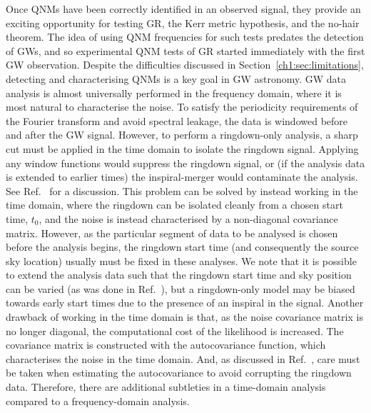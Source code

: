 Once QNMs have been correctly identified in an observed signal, they provide an exciting opportunity for testing GR, the Kerr metric hypothesis, and the no-hair theorem. 
The idea of using QNM frequencies for such tests predates the detection of GWs, and so experimental QNM tests of GR started immediately with the first GW observation.
Despite the difficulties discussed in Section~\ref{ch1:sec:limitations}, detecting and characterising QNMs is a key goal in GW astronomy. 
GW data analysis is almost universally performed in the frequency domain, where it is most natural to characterise the noise.
To satisfy the periodicity requirements of the Fourier transform and avoid spectral leakage, the data is windowed before and after the GW signal.
However, to perform a ringdown-only analysis, a sharp cut must be applied in the time domain to isolate the ringdown signal. 
Applying any window functions would suppress the ringdown signal, or (if the analysis data is extended to earlier times) the inspiral-merger would contaminate the analysis.
See Ref.~\cite{Isi:2021iql} for a discussion.
This problem can be solved by instead working in the time domain, where the ringdown can be isolated cleanly from a chosen start time, $t_0$, and the noise is instead characterised by a non-diagonal covariance matrix.
However, as the particular segment of data to be analysed is chosen before the analysis begins, the ringdown start time (and consequently the source sky location) usually must be fixed in these analyses. 
We note that it is possible to extend the analysis data such that the ringdown start time and sky position can be varied (as was done in Ref.~\cite{Carullo:2019flw}), but a ringdown-only model may be biased towards early start times due to the presence of an inspiral in the signal.
Another drawback of working in the time domain is that, as the noise covariance matrix is no longer diagonal, the computational cost of the likelihood is increased. 
The covariance matrix is constructed with the autocovariance function, which characterises the noise in the time domain.
And, as discussed in Ref.~\cite{Isi:2021iql}, care must be taken when estimating the autocovariance to avoid corrupting the ringdown data. 
Therefore, there are additional subtleties in a time-domain analysis compared to a frequency-domain analysis.

